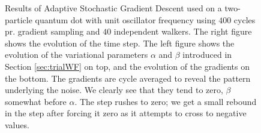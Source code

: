 \begin{figure}[h]
 \begin{center}
  \caption{Results of Adaptive Stochastic Gradient Descent used on a two-particle quantum dot with unit oscillator frequency using $400$ cycles pr. gradient sampling and $40$ independent walkers. The right figure shows the evolution of the time step. The left figure shows the evolution of the variational parameters $\alpha$ and $\beta$ introduced in Section \ref{sec:trialWF} on top, and the evolution of the gradients on the bottom. The gradients are cycle averaged to reveal the pattern underlying the noise. We clearly see that they tend to zero, $\beta$ somewhat before $\alpha$. The step rushes to zero; we get a small rebound in the step after forcing it zero as it attempts to cross to negative values.}
  \label{fig:ASGD_Ex}
 \end{center}
\end{figure}



